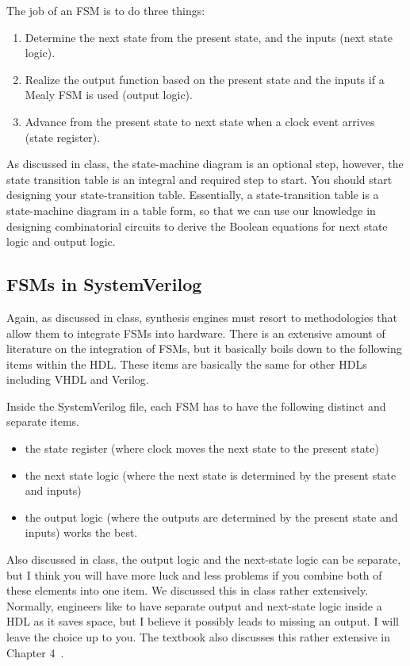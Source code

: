 \documentclass{article}
\begin{document}
The job of an FSM is to do three things:
\begin{enumerate}
\item Determine the next state from the present state, 
  and the inputs (next state logic).
\item Realize the output function based on the present state and the
  inputs if a Mealy FSM is used (output logic).  
\item Advance from the present state to next state when a clock event
  arrives (state register).
\end{enumerate}
 
As discussed in class, the state-machine diagram is an optional step,
however, the state transition table is an integral and required step
to start.  You should start designing your state-transition table.
Essentially, a state-transition table is a state-machine diagram in
a table form, so that we can use our
knowledge in designing combinatorial circuits to derive the Boolean
equations for next state logic and output logic.

\subsection{FSMs in SystemVerilog}

Again, as discussed in class, synthesis engines must resort to
methodologies that allow them to integrate FSMs into hardware.  There
is an extensive amount of literature on the integration of FSMs, but
it basically boils down to the following items within the HDL.  These
items are basically the same for other HDLs including VHDL and Verilog.

Inside the SystemVerilog file, each FSM has to have the following
distinct and separate items.
\begin{itemize}
\item the state register (where clock moves the next state to the present state)
\item the next state logic (where the next state is determined by the
present state and inputs)
\item the output logic (where the outputs are determined by the present
state and inputs)
works the best.
\end{itemize}

Also discussed in class, the output logic and the next-state logic can
be separate, but I think you will have more luck and less problems if
you combine both of these elements into one item.  We discussed this
in class rather extensively.  Normally, engineers like to have
separate output and next-state logic inside a HDL as it saves space,
but I believe it possibly leads to missing an output.  I will leave
the choice up to you.  The textbook also discusses this rather
extensive in Chapter 4~\cite{ddca-riscv}.
\end{document}
